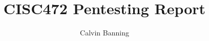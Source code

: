 % 
%

%
\title[First Line of Title Second Line of Title]{CISC472 Pentesting Report\\
}
\author{Calvin Banning}
\majorfieldtrue{}
\subject{CISC472}

\maketitlepage  %

\begin{front} %


\figurespagefalse

\tablespagefalse 

\maketocloflot

\end{front} %
